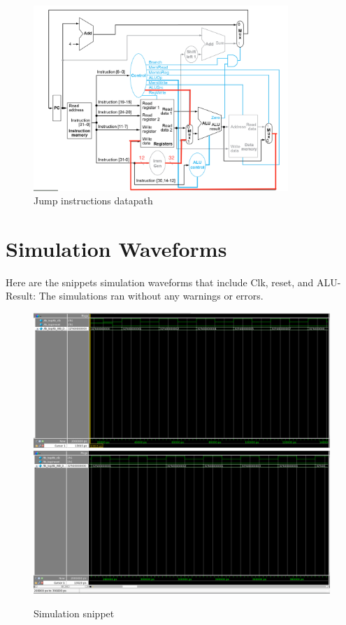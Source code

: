 \documentclass[20pt]{article}
\begin{document}
\begin{figure}[H]
	\includegraphics[width=0.9\linewidth,height=7cm]{RIdatapath}
	\caption{Jump instructions datapath }
\end{figure}


\section{Simulation Waveforms}
Here are the snippets simulation waveforms that include Clk, reset, and ALU-Result:
The simulations ran without any warnings or errors.

\begin{figure}[H]
\includegraphics[width=\linewidth]{simulation1}
\linebreak
\includegraphics[width=\linewidth]{simulation2}
\caption{Simulation snippet}
\end{figure}
\end{document}
